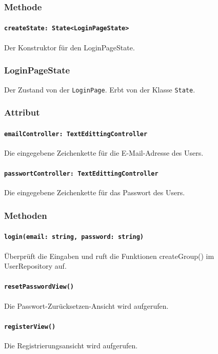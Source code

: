 \documentclass[parskip=full]{scrartcl}
\begin{document}
        \subsubsection*{Methode}
            \paragraph*{\texttt{createState: State<LoginPageState>}} Der Konstruktor für den LoginPageState.
    
    \subsubsection{LoginPageState}
        Der Zustand von der \texttt{LoginPage}. Erbt von der Klasse \texttt{State}.
        \subsubsection*{Attribut}
            \paragraph*{\texttt{emailController: TextEdittingController}} Die eingegebene Zeichenkette für die E-Mail-Adresse des Users.
            \paragraph*{\texttt{passwortController: TextEdittingController}} Die eingegebene Zeichenkette für das Passwort des Users.

        \subsubsection*{Methoden}
            \paragraph*{\texttt{login(email: string, password: string)}} Überprüft die Eingaben und ruft die Funktionen createGroup() im UserRepository auf.
            \paragraph*{\texttt{resetPasswordView()}}  Die Passwort-Zurücksetzen-Ansicht wird aufgerufen.
            \paragraph*{\texttt{registerView()}}  Die Registrierungsansicht wird aufgerufen.
\end{document}
